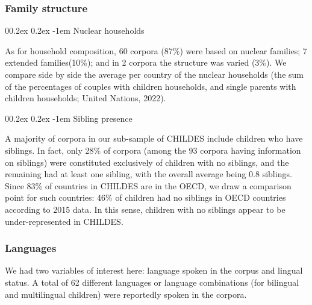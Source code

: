 \documentclass[
  man,floatsintext]{apa6}
\makeatletter
\let\oldparagraph\paragraph
\renewcommand{\paragraph}[1]{\oldparagraph{#1}\mbox{}}
\renewcommand{\paragraph}{\@startsection{paragraph}{4}{\parindent}%
  {0\baselineskip \@plus 0.2ex \@minus 0.2ex}%
  {-1em}%
  {\normalfont\normalsize\bfseries\itshape\typesectitle}}
\makeatother
\begin{document}
\subsubsection{Family structure}\label{family-structure-1}

\paragraph{Nuclear households}\label{nuclear-households}

As for household composition, 60 corpora (87\%) were based on nuclear families; 7 extended families(10\%); and in 2 corpora the structure was varied (3\%). We compare side by side the average per country of the nuclear households (the sum of the percentages of couples with children households, and single parents with children households; United Nations, 2022).

\paragraph{Sibling presence}\label{sibling-presence}

A majority of corpora in our sub-sample of CHILDES include children who have siblings. In fact, only 28\% of corpora (among the 93 corpora having information on siblings) were constituted exclusively of children with no siblings, and the remaining had at least one sibling, with the overall average being 0.8 siblings. Since 83\% of countries in CHILDES are in the OECD, we draw a comparison point for such countries: 46\% of children had no siblings in OECD countries according to 2015 data. In this sense, children with no siblings appear to be under-represented in CHILDES.

\subsubsection{Languages}\label{languages}

We had two variables of interest here: language spoken in the corpus and lingual status. A total of 62 different languages or language combinations (for bilingual and multilingual children) were reportedly spoken in the corpora.
\end{document}
